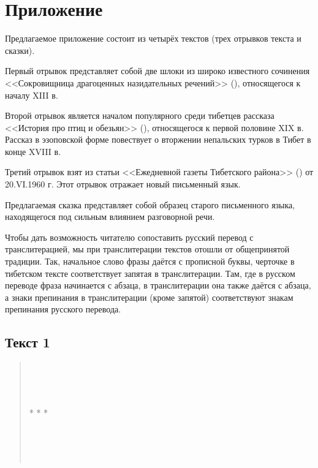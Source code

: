 \chapter{Приложение}

Предлагаемое приложение состоит из четырёх текстов (трех отрывков текста и сказки).

Первый отрывок представляет собой две шлоки из широко известного сочинения <<Сокровищница драгоценных назидательных речений>> (), относящегося к началу XIII в.

Второй отрывок является началом популярного среди тибетцев рассказа <<История про птиц и обезьян>> (), относящегося к первой половине XIX в. Рассказ в эзоповской форме повествует о вторжении непальских турков в Тибет в конце XVIII в.

Третий отрывок взят из статьи <<Ежедневной газеты Тибетского района>> () от 20.VI.1960 г. Этот отрывок отражает новый письменный язык.

Предлагаемая сказка представляет собой образец старого письменного языка, находящегося под сильным влиянием разговорной речи.

Чтобы дать возможность читателю сопоставить русский перевод с транслитерацией, мы при транслитерации текстов отошли от общепринятой традиции. Так, начальное слово фразы даётся с прописной буквы, черточке в тибетском тексте соответствует запятая в транслитерации. Там, где в русском переводе фраза начинается с абзаца, в транслитерации она также даётся с абзаца, а знаки препинания в транслитерации (кроме запятой) соответствуют знакам препинания русского перевода.
\pagebreak

\section{Текст 1}

\begin{verse}
	\\
	\\
	\\

	* * *

	\\
	\\
	\\
\end{verse}

